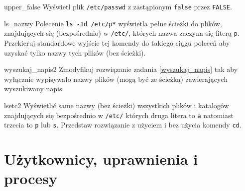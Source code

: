 \documentclass{pdfBooklets}
\begin{document}
\setcounter{subsection}{0} %

\begin{Zadanie}{}{upper_false}
Wyświetl plik \texttt{/etc/passwd} z zastąpionym \texttt{false} przez \texttt{FALSE}.
\end{Zadanie}

\begin{Zadanie}{}{ls_nazwy}
Polecenie \Verb#ls -1d /etc/p*# wyświetla pełne ścieżki do plików, znajdujących się (bezpośrednio) w \texttt{/etc/}, których nazwa zaczyna się literą \texttt{p}.
Przekieruj standardowe wyjście tej komendy do takiego ciągu poleceń aby uzyskać tylko nazwy tych plików (bez ścieżki).
\end{Zadanie}


\begin{Zadanie}{}{wyszukaj_napis2}
Zmodyfikuj rozwiązanie zadania \ref{wyszukaj_napis} tak aby wyłącznie wypisywało nazwy plików (mogą być ze ścieżką) zawierających wyszukiwany napis.
\end{Zadanie}

\begin{Zadanie}{}{lsetc2}
Wyświetlić same nazwy (bez ścieżki) wszystkich plików i katalogów znajdujących się bezpośrednio w \texttt{/etc/} których druga litera to \texttt{a} natomiast trzecia to \texttt{p} lub \texttt{s}.
Przedstaw rozwiązanie z użyciem i bez użycia komendy \texttt{cd}.
\end{Zadanie}


\section{Użytkownicy, uprawnienia i procesy}

\end{document}
